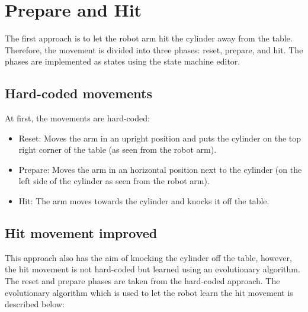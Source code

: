 \section{Prepare and Hit} \label{sec:PrepareHit}

The first approach is to let the robot arm hit the cylinder away from the table. Therefore, the movement is divided into three phases: reset, prepare, and hit. The phases are implemented as states using the state machine editor.

\subsection{Hard-coded movements}

At first, the movements are hard-coded:

\begin{itemize}
\item Reset: Moves the arm in an upright position and puts the cylinder on the top right corner of the table (as seen from the robot arm).
\item Prepare: Moves the arm in an horizontal position next to the cylinder (on the left side of the cylinder as seen from the robot arm).
\item Hit: The arm moves towards the cylinder and knocks it off the table.
\end{itemize}

\subsection{Hit movement improved} 

This approach also has the aim of knocking the cylinder off the table, however, the hit movement is not hard-coded but learned using an evolutionary algorithm. The reset and prepare phases are taken from the hard-coded approach.
The evolutionary algorithm which is used to let the robot learn the hit movement is described below: 

